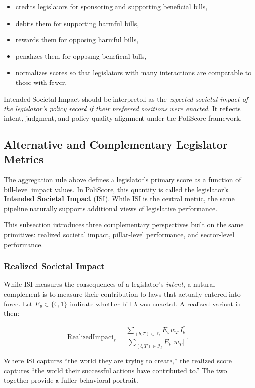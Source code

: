 \documentclass[12pt]{article}
\begin{document}
\begin{itemize}
    \item credits legislators for sponsoring and supporting beneficial bills,
    \item debits them for supporting harmful bills,
    \item rewards them for opposing harmful bills,
    \item penalizes them for opposing beneficial bills,
    \item normalizes scores so that legislators with many interactions are comparable to those with fewer.
\end{itemize}

Intended Societal Impact should be interpreted as the \emph{expected societal impact of the legislator's policy record if
their preferred positions were enacted}. It reflects intent, judgment, and policy quality alignment under the PoliScore
framework.

\subsection{Alternative and Complementary Legislator Metrics}
\label{subsec:alt-metrics}

The aggregation rule above defines a legislator’s primary score as a function of bill-level impact values. In PoliScore,
this quantity is called the legislator’s \textbf{Intended Societal Impact} (ISI). While ISI is the central metric, the
same pipeline naturally supports additional views of legislative performance.

This subsection introduces three complementary perspectives built on the same primitives: realized societal impact,
pillar-level performance, and sector-level performance.

\subsubsection{Realized Societal Impact}

While ISI measures the consequences of a legislator’s \emph{intent}, a natural complement is to measure their contribution
to laws that actually entered into force. Let $E_b \in \{0,1\}$ indicate whether bill $b$ was enacted. A realized variant
is then:

\[
\text{RealizedImpact}_{\ell} =
\frac{\sum_{(b, T) \in \mathcal{I}_{\ell}} E_b \, w_T \, I_b^{\ast}}
     {\sum_{(b, T) \in \mathcal{I}_{\ell}} E_b \, |w_T|}.
\]

Where ISI captures ``the world they are trying to create,'' the realized score captures ``the world their successful
actions have contributed to.'' The two together provide a fuller behavioral portrait.
\end{document}
